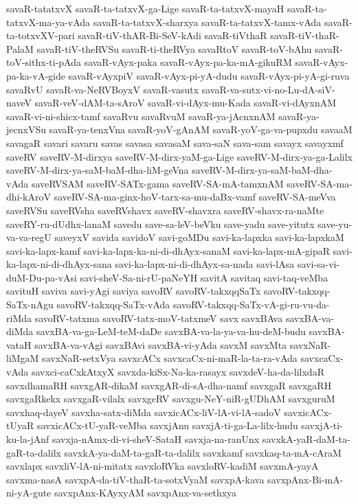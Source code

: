 {savaR-tatatxvX
savaR-ta-tatxvX-ga-Lige
savaR-ta-tatxvX-mayaH
savaR-ta-tatxvX-ma-ya-vAda
savaR-ta-tatxvX-sharxya
savaR-ta-tatxvX-tamx-vAda
savaR-ta-totxvXV-pari
savaR-tiV-thAR-Bi-SeV-kAdi
savaR-tiVthaR
savaR-tiV-thaR-PalaM
savaR-tiV-theRVSu
savaR-ti-theRVya
savaRtoV
savaR-toV-bAhu
savaR-toV-sithx-ti-pAda
savaR-vAyx-paka
savaR-vAyx-pa-ka-mA-gikuRM
savaR-vAyx-pa-ka-vA-gide
savaR-vAyxpiV
savaR-vAyx-pi-yA-dudu
savaR-vAyx-pi-yA-gi-ruva
savaRvU
savaR-va-NeRVBoyxV
savaR-vasutx
savaR-va-sutx-vi-no-Lu-dA-siV-naveV
savaR-veV-dAM-ta-sAroV
savaR-vi-dAyx-mu-Kada
savaR-vi-dAyxnAM
savaR-vi-ni-shicx-tamf
savaRvu
savaRvuM
savaR-ya-jAcnxnAM
savaR-ya-jecnxVSu
savaR-ya-tenxVna
savaR-yoV-gAnAM
savaR-yoV-ga-va-pupxdu
savaaM
savagaR
savari
savaru
savas
savasa
savasaM
sava-saN
sava-sam
savayx
savayxmf
saveRV
saveRV-M-dirxya
saveRV-M-dirx-yaM-ga-Lige
saveRV-M-dirx-ya-ga-Lalilx
saveRV-M-dirx-ya-saM-baM-dha-liM-geVna
saveRV-M-dirx-ya-saM-baM-dha-vAda
saveRVSAM
saveRV-SATx-gama
saveRV-SA-mA-tamxnAM
saveRV-SA-ma-dhi-kAroV
saveRV-SA-ma-ginx-hoV-tarx-sa-mu-daBx-vamf
saveRV-SA-meVva
saveRVSu
saveRVsha
saveRVshavx
saveRV-shavxra
saveRV-shavx-ra-naMte
saveRY-ru-dUdhx-lanaM
savedu
save-sa-leV-beVku
save-yadu
save-yitutx
save-yu-va-va-regU
saveyxV
savida
savidoV
savi-goMDu
savi-ka-lapxka
savi-ka-lapxkaM
savi-ka-lapx-kamf
savi-ka-lapx-ka-ni-di-dhAyx-sanaM
savi-ka-lapx-mA-gipaR
savi-ka-lapx-ni-di-dhAyx-sana
savi-ka-lapx-ni-di-dhAyx-sa-nada
savi-lAsa
savi-sa-vi-duM-Du-pa-vAsi
savi-sheV-Sa-ni-rU-paNeYH
savitA
savitaq
savi-taq-veMba
savituH
saviva
savi-yAgi
saviya
savoRV
savoRV-takxqqSaTx
savoRV-takxqq-SaTx-nAgu
savoRV-takxqq-SaTx-vAda
savoRV-takxqq-SaTx-vA-gi-ru-vu-da-riMda
savoRV-tatxma
savoRV-tatx-moV-tatxmeV
savx
savxBAva
savxBA-va-diMda
savxBA-va-ga-LeM-teM-daDe
savxBA-va-la-ya-va-hu-deM-budu
savxBA-vataH
savxBA-va-vAgi
savxBAvi
savxBA-vi-yAda
savxM
savxMta
savxNaR-liMgaM
savxNaR-setxVya
savxcACx
savxcaCx-ni-maR-la-ta-ra-vAda
savxcaCx-vAda
savxci-caCxkAtxyX
savxda-kiSx-Na-ka-rasayx
savxdeV-ha-da-lilxdaR
savxdhamaRH
savxgAR-dikaM
savxgAR-di-sA-dha-namf
savxgaR
savxgaRH
savxgaRkekx
savxgaR-vilalx
savxgeRV
savxgu-NeY-niR-gUDhAM
savxguruM
savxhaq-dayeV
savxha-satx-diMda
savxicACx-liV-lA-vi-lA-sadoV
savxicACx-tUyaR
savxicACx-tU-yaR-veMba
savxjAnu
savxjA-ti-ga-La-lilx-hudu
savxjA-ti-ku-la-jAnf
savxja-nAmx-di-vi-sheV-SataH
savxja-na-ranUnx
savxkA-yaR-daM-ta-gaR-ta-dalilx
savxkA-ya-daM-ta-gaR-ta-dalilx
savxkamf
savxkaq-ta-mA-cAraM
savxlapx
savxliV-lA-ni-mitatx
savxloRVka
savxloRV-kadiM
savxmA-yayA
savxma-nasA
savxpA-da-tiV-thaR-ta-sotxVyaM
savxpA-kava
savxpAnx-Bi-mA-ni-yA-gute
savxpAnx-KAyxyAM
savxpAnx-va-sethxya
}
